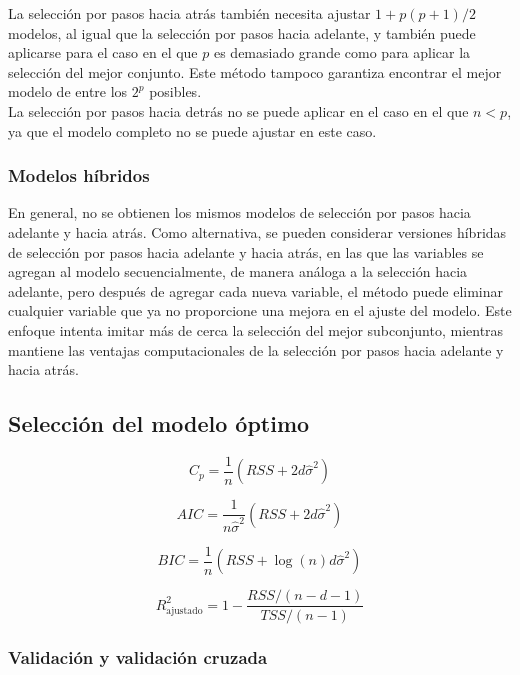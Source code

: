 La selección por pasos hacia atrás también necesita ajustar $1 + p(p+1)/2$ modelos, al igual que la selección por pasos hacia adelante, y también puede aplicarse para el caso en el que $p$ es demasiado grande como para aplicar la selección del mejor conjunto. Este método tampoco garantiza encontrar el mejor modelo de entre los $2^p$ posibles. \\

La selección por pasos hacia detrás no se puede aplicar en el caso en el que $n < p$, ya que el modelo completo no se puede ajustar en este caso.

\subsubsection{Modelos híbridos}

En general, no se obtienen los mismos modelos de selección por pasos hacia adelante y hacia atrás. Como alternativa, se pueden considerar versiones híbridas de selección por pasos hacia adelante y hacia atrás, en las que las variables se agregan al modelo secuencialmente, de manera análoga a la selección hacia adelante, pero después de agregar cada nueva variable, el método puede eliminar cualquier variable que ya no proporcione una mejora en el ajuste del modelo. Este enfoque intenta imitar más de cerca la selección del mejor subconjunto, mientras mantiene las ventajas computacionales de la selección por pasos hacia adelante y hacia atrás.

\subsection{Selección del modelo óptimo}

\begin{equation}
C_p = \frac{1}{n}(RSS + 2d\hat{\sigma}^2)
\end{equation}

\begin{equation}
AIC = \frac{1}{n\hat{\sigma}^2}(RSS + 2d\hat{\sigma}^2)
\end{equation}

\begin{equation}
BIC = \frac{1}{n}(RSS + \log(n)d\hat{\sigma}^2)
\end{equation}

\begin{equation}
R^2_{\text{ajustado}} = 1 - \frac{RSS/(n-d-1)}{TSS/(n-1)}
\end{equation}

\subsubsection{Validación y validación cruzada}

